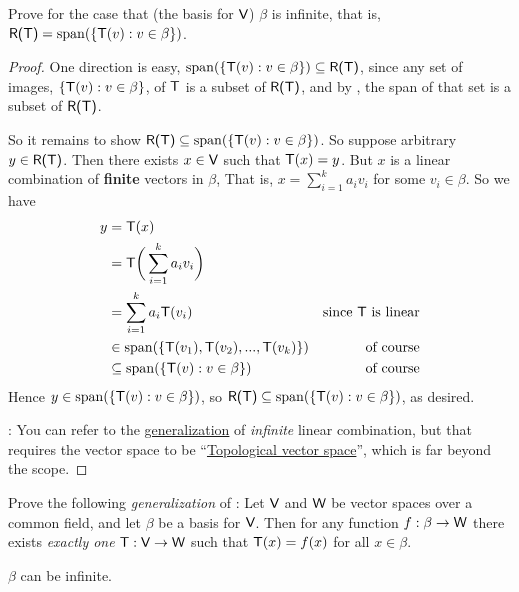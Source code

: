 \begin{exercise} \label{exercise 2.1.34}
Prove  for the case that (the basis for \(\textsf{V}\)) \(\beta\) is infinite,
that is, \(\textsf{R(T)} = \operatorname{span}(\{ \textsf{T}(v) : v \in \beta \})\).
\end{exercise}

\begin{proof}
One direction is easy, \(\operatorname{span}(\{ \textsf{T}(v) : v \in \beta \}) \subseteq \textsf{R(T)}\), since any set of images, \(\{ \textsf{T}(v) : v \in \beta \}\), of \(\textsf{T}\) is a subset of \(\textsf{R(T)}\), and by , the span of that set is a subset of \(\textsf{R(T)}\).

So it remains to show \(\textsf{R(T)} \subseteq \operatorname{span}(\{ \textsf{T}(v) : v \in \beta \})\).
So suppose arbitrary \(y \in \textsf{R(T)}\).
Then there exists \(x \in \textsf{V}\) such that \(\textsf{T}(x) = y\).
But \(x\) is a linear combination of \textbf{finite}\RED{*} vectors in \(\beta\),
That is, \(x = \sum_{i = 1}^k a_i v_i\) for some \(v_i \in \beta\).
So we have
\begin{align*}
    y & = \textsf{T}(x) \\
      & = \textsf{T}\bigg(\sum_{i = 1}^k a_i v_i\bigg) \\
      & = \sum_{i = 1}^k a_i \textsf{T}(v_i) & \text{since \(\textsf{T}\) is linear} \\
      & \in \operatorname{span}(\{ \textsf{T}(v_1), \textsf{T}(v_2), ..., \textsf{T}(v_k) \}) & \text{of course} \\
      & \subseteq \operatorname{span}(\{ \textsf{T}(v) : v \in \beta \}) & \text{of course}
\end{align*}
Hence \(y \in \operatorname{span}(\{ \textsf{T}(v) : v \in \beta \})\), so \(\textsf{R(T)} \subseteq \operatorname{span}(\{ \textsf{T}(v) : v \in \beta \})\), as desired.

\RED{*}: You can refer to the \href{https://www.wikiwand.com/en/Linear_combination#/Generalizations}{generalization} of \emph{infinite} linear combination, but that requires the vector space to be ``\href{https://www.wikiwand.com/en/Topological_vector_space}{Topological vector space}'', which is far beyond the scope.
\end{proof}

\begin{exercise} \label{exercise 2.1.35}
Prove the following \emph{generalization} of :
Let \(\textsf{V}\) and \(\textsf{W}\) be vector spaces over a common field, and let \(\beta\) be a basis for \(\textsf{V}\).
Then for any function \(f: \beta \to \textsf{W}\) there exists \emph{exactly one} \LTRAN{} \(\textsf{T}: \textsf{V} \to \textsf{W}\) such that \(\textsf{T}(x) = f(x)\) for all \(x \in \beta\).

 \(\beta\) can be infinite.
\end{exercise}

